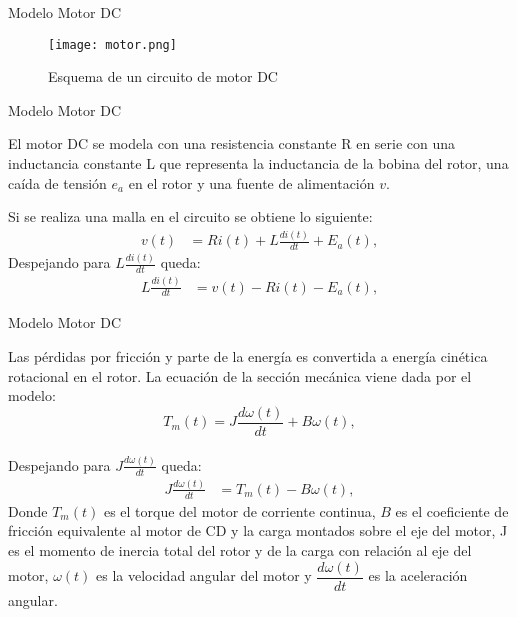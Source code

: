 \documentclass{beamer}
\begin{document}
\begin{frame}{Modelo Motor DC}
\begin{justify}
\vspace{0.3cm}
\begin{itemize}
\begin{figure}[h]
    \centering
    \texttt{[image: motor.png]}
    \caption{Esquema de un circuito de motor DC}
    \label{fig:enter-label}
\end{figure}
\end{itemize}
\end{justify}
\end{frame}

\begin{frame}{Modelo Motor DC}
\begin{justify}
\vspace{0.3cm}
\begin{itemize}
    El motor DC se modela con una resistencia constante R en serie con una inductancia constante L que representa la inductancia de la bobina del rotor, una caída de tensión $e_a$ en el rotor y una fuente de alimentación $v$.

Si se realiza una malla en el circuito se obtiene lo siguiente:
\begin{align}
v(t) &= Ri(t) + L\frac{di(t)}{dt}+E_a (t), 
\end{align}
Despejando para $L\frac{di(t)}{dt}$ queda:
\begin{align}
 L\frac{di(t)}{dt} &= v(t)-Ri(t) - E_a (t), 
\end{align}
\end{itemize}
\end{justify}
\end{frame}

\begin{frame}{Modelo Motor DC}
\begin{justify}
\vspace{0.3cm}
\begin{itemize}  
    Las pérdidas por fricción y parte de la energía es convertida a energía cinética rotacional en el rotor. La ecuación de la sección mecánica viene dada por el modelo:
\begin{equation*}
    T_m(t) = J\frac{d\omega(t)}{dt}+B\omega(t), 
\end{equation*}
\\
Despejando para $J\frac{d\omega(t)}{dt}$ queda:
\begin{align}
 J\frac{d\omega(t)}{dt} &= T_m(t)-B\omega(t), 
\end{align}
    Donde $T_m(t)$ es el torque del motor de corriente continua, $B$ es el coeficiente de fricción equivalente al motor de CD y la carga montados sobre el eje del motor, J es el momento de inercia total del rotor y de la carga con relación al eje del motor, $\omega(t)$ es la velocidad angular del motor y $\dfrac{d\omega(t)}{dt}$ es la aceleración angular.
\end{itemize}
\end{justify}
\end{frame}
\end{document}

